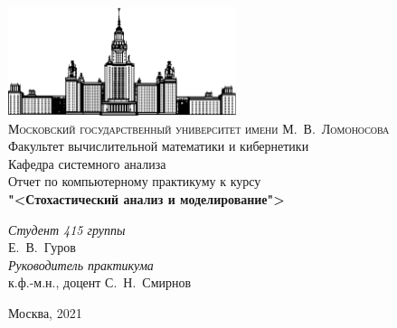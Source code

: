 \begin{titlepage}
    \begin{centering}
        \includegraphics[width=0.5\textwidth]{resources/msu.png}\\
        {\scshape Московский государственный университет имени М.~В.~Ломоносова}\\
        Факультет вычислительной математики и кибернетики\\
        Кафедра системного анализа\\
        \vfill
        {\LARGE Отчет по компьютерному практикуму к курсу}\\
        \vspace{1cm}
        {\Huge\bfseries "<Стохастический анализ и моделирование">\\}
    \end{centering}
    \vspace{1cm}
    \begin{flushright}
        \begin{large}
            {\itshape Студент 415 группы\\}
            Е.~В.~Гуров\\
            \vspace{5mm}
            {\itshape Руководитель практикума\\}
            к.ф.-м.н., доцент С.~Н.~Смирнов\\
        \end{large}
    \end{flushright}
    \vfill
    \begin{centering}
        Москва, 2021\\ 
    \end{centering}
\end{titlepage}